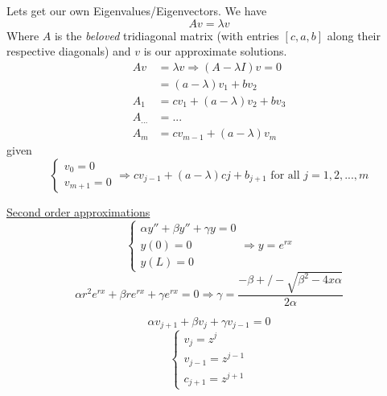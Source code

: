 \documentclass[10pt]{article}
\begin{document}
Lets get our own Eigenvalues/Eigenvectors. We have
\[Av  = \lambda v\]
Where $A$ is the \textit{beloved} tridiagonal matrix (with entries $[c,a,b]$ along their respective diagonals) and $v$ is our approximate solutions.
\begin{align*}
    Av &= \lambda v \Rightarrow (A - \lambda I)v = 0\\
       &= (a - \lambda) v_1 + b v_2\\
   A_1 &= c v_1 + (a - \lambda) v_2 + bv_3\\
   A_{...} &= ...\\
   A_m &= c v_{m-1} + (a - \lambda) v_m
\end{align*}
given
\[
    \begin{cases}
    v_0 = 0\\
    v_{m+1} = 0
\end{cases} \Rightarrow c v_{j-1} + (a - \lambda) cj + b_{j+1} \text{ for all } j=1,2,...,m\]

\underline{Second order approximations}
\[\begin{cases}
\alpha y'' + \beta y'' + \gamma y = 0\\
y(0) = 0\\
y(L) = 0
\end{cases} \Rightarrow y = e^{rx}\]
\[\alpha r^2 e^{rx} + \beta r e^{rx} + \gamma e^{rx} = 0 \Rightarrow \gamma = \frac{- \beta +/- \sqrt{\beta^2 - 4 x \alpha}}{2 \alpha}\]

\[\alpha v_{j+1} + \beta v_j + \gamma v_{j-1} = 0\]
\[\begin{cases}
v_j = z^j\\
v_{j-1} = z^{j-1}\\
c_{j+1} = z^{j+1}
\end{cases}\]


\noindent \underline{\hspace{3in}}\\
\end{document}
